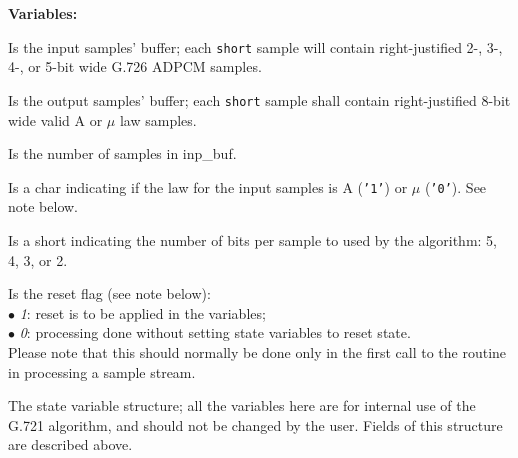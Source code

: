{\bf Variables: }
\begin{Descr}{\DescrLen}
\item[\pbox{20mm}{\em inp\_buf}] %
               Is the input samples' buffer; each {\tt short} sample
               will contain right-justified 2-, 3-, 4-, or 5-bit wide
               G.726 ADPCM samples.

\item[\pbox{20mm}{\em out\_buf}] %
               Is the output samples' buffer; each {\tt short} sample
               shall contain right-justified 8-bit wide valid A or $\mu$
               law samples.

\item[\pbox{20mm}{\em smpno}] %
               Is the number of samples in inp\_buf.

\item[\pbox{20mm}{\em law}] %
               Is a char indicating if the law for the input samples is A
               ({\tt '1'}) or $\mu$ ({\tt '0'}). See note below.

\item[\pbox{20mm}{\em rate}] %
               Is a short indicating the number of bits per sample to used by
               the algorithm: 5, 4, 3, or 2.

\item[\pbox{20mm}{\em reset}] %
               Is the reset flag (see note below):\\
               $\bullet$ {\em 1}: reset is to be applied in the variables;\\
               $\bullet$ {\em 0}: processing done without setting state
               variables to reset state. \\
               Please note that this should normally be
               done only in the first call to the routine in processing a
               sample stream.

\item[\pbox{20mm}{\em state}] %
               The state variable structure; all the variables here are for
               internal use of the G.721 algorithm, and should not be
               changed by the user. Fields of this structure are described
               above.
\end{Descr}

